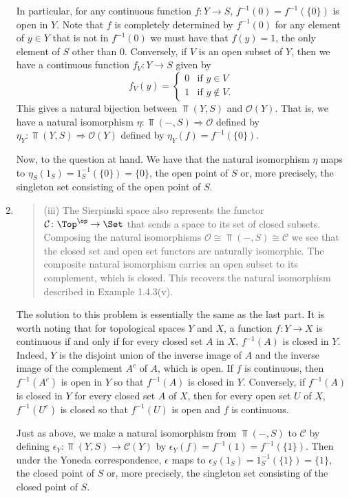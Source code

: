 \documentclass[main.tex]{subfiles}
\begin{document}
\begin{enumerate}
In particular, for any continuous function $f\colon Y\rightarrow S$, 
$f^{-1}(0)=f^{-1}(\{0\})$ is open in $Y$. Note that $f$ is completely 
determined by $f^{-1}(0)$ for any element of $y\in Y$ that is not in 
$f^{-1}(0)$ we must have that $f(y)=1$, the only element of $S$ other than $0$. 
Conversely, if $V$ is an open subset of $Y$, then we have a continuous function 
$f_V\colon Y\rightarrow S$ given by 
\[f_V(y)=\begin{cases}0 &\text{if }y\in V\\1 &\text{if }y\notin V.\end{cases}\]
This gives a natural bijection between $\Top(Y,S)$ and $\mathcal{O}(Y)$. That 
is, we have a natural isomorphism $\eta\colon \Top(-,S)\Rightarrow\mathcal O$ 
defined by $\eta_Y\colon \Top(Y,S)\Rightarrow{\mathcal O}(Y)$ defined by 
$\eta_Y(f)=f^{-1}(\{0\})$. 

Now, to the question at hand. We have that the natural isomorphism $\eta$ maps 
to $\eta_S(1_S)=1_S^{-1}(\{0\})=\{0\}$, the open point of $S$ or, more 
precisely, the singleton set consisting of the open point of $S$.
\item 
\begin{quote}
(iii) The Sierpinski space also represents the functor ${\mathcal C}\colon 
\Top^\op\rightarrow\Set$ that sends a space to its set of closed subsets. 
Composing the natural isomorphisms ${\mathcal O}\cong\Top{(-,S)}\cong{\mathcal 
C}$ we see that the closed set and open set functors are naturally 
isomorphic. The composite natural isomorphism carries an open subset to its 
complement, which is closed. This recovers the natural isomorphism described in 
Example 1.4.3(v).
\end{quote}
The solution to this problem is essentially the same as the last part. It is 
worth noting that for topological spaces $Y$ and $X$, a function $f\colon 
Y\rightarrow X$ is continuous if and only if for every closed set $A$ in $X$, 
$f^{-1}(A)$ is closed in $Y$. Indeed, $Y$ is the disjoint union of the inverse 
image of $A$ and the inverse image of the complement $A^c$ of $A$, which is 
open. If $f$ is continuous, then $f^{-1}(A^c)$ is open in $Y$ so that 
$f^{-1}(A)$ is closed in $Y$. Conversely, if $f^{-1}(A)$ is closed in $Y$ for 
every closed set $A$ of $X$, then for every open set $U$ of $X$, $f^{-1}(U^c)$ 
is closed so that $f^{-1}(U)$ is open and $f$ is continuous.

Just as above, we make a natural isomorphism from $\Top(-,S)$ to $\mathcal C$ 
by defining $\epsilon_Y\colon \Top(Y,S)\rightarrow{\mathcal C}(Y)$ by 
$\epsilon_Y(f)=f^{-1}(1)=f^{-1}(\{1\})$. Then under the Yoneda correspondence, 
$\epsilon$ maps to $\epsilon_S(1_S)=1_S^{-1}(\{1\})=\{1\}$, the closed point of 
$S$ or, more precisely, the singleton set consisting of the closed point of $S$.
\end{enumerate}
\end{document}
